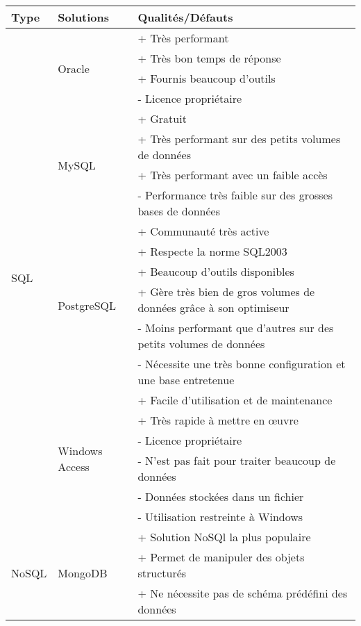         \begin{center}
        \begin{tabular}{|l|l|l|}
            \hline Type & Solutions & Qualités/Défauts \\ \hline
            \multirow{20}{*}{SQL} & \multirow{4}{*}{Oracle} & + Très performant \\
            & & + Très bon temps de réponse \\
            & & + Fournis beaucoup d'outils \\
            & & - Licence propriétaire \\ \cline{2-3}
            & \multirow{4}{*}{MySQL} & + Gratuit \\
            & & + Très performant sur des petits volumes de données \\
            & & + Très performant avec un faible accès \\
            & & - Performance très faible sur des grosses bases de données \\ \cline{2-3}
            & \multirow{6}{*}{PostgreSQL} & + Communauté très active \\
            & & + Respecte la norme SQL2003 \\
            & & + Beaucoup d’outils disponibles \\
            & & + Gère très bien de gros volumes de données grâce à son optimiseur \\
            & & - Moins performant que d’autres sur des petits volumes de données \\
            & & - Nécessite une très bonne configuration et une base entretenue \\ \cline{2-3}
            & \multirow{6}{*}{Windows Access} & + Facile d’utilisation et de maintenance \\
            & & + Très rapide à mettre en œuvre \\
            & & - Licence propriétaire \\
            & & - N’est pas fait pour traiter beaucoup de données \\
            & & - Données stockées dans un fichier \\
            & & - Utilisation restreinte à Windows \\ \hline
            \multirow{15}{*}{NoSQL} & \multirow{5}{*}{MongoDB} & + Solution NoSQl la plus populaire \\
            & & + Permet de manipuler des objets structurés \\
            & & + Ne nécessite pas de schéma prédéfini des données \\

\end{tabular}
\end{center}
